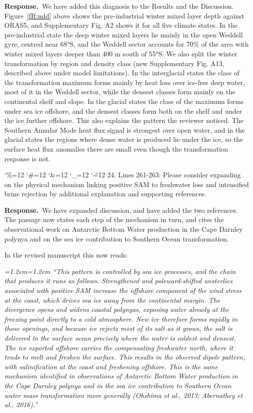 \documentclass[11pt,a4paper]{article}
\newcommand{\comment}[1]{\par\medskip\noindent\color{black}\begingroup\catcode`\%=12 \catcode`\#=12 \catcode`\&=12 \catcode`\_=12 \catcode`\~=12 \commentbody}
\newcommand{\commentbody}[1]{#1\endgroup\par\smallskip}
\newcommand{\response}{\par\noindent\color{chgcol}\textbf{Response.}\ }
\newenvironment{change}{\par\smallskip\color{chgcol}\small\itshape\leftskip=1.2em\rightskip=1.2em\noindent\ignorespaces}{\par\smallskip}
\begin{document}
\response We have added this diagnosis to the Results and the Discussion. Figure~\ref{fR:mld} above shows the pre-industrial winter mixed layer depth against ORAS5, and Supplementary Fig. A2 shows it for all five climate states. In the pre-industrial state the deep winter mixed layers lie mainly in the open Weddell gyre, centred near 68°S, and the Weddell sector accounts for 70\% of the area with winter mixed layers deeper than 400 m south of 55°S. We also split the winter transformation by region and density class (new Supplementary Fig. A13, described above under model limitations). In the interglacial states the class of the transformation maximum forms mainly by heat loss over ice-free deep water, most of it in the Weddell sector, while the densest classes form mainly on the continental shelf and slope. In the glacial states the class of the maximum forms under sea ice offshore, and the densest classes form both on the shelf and under the ice further offshore. This also explains the pattern the reviewer noticed. The Southern Annular Mode heat flux signal is strongest over open water, and in the glacial states the regions where dense water is produced lie under the ice, so the surface heat flux anomalies there are small even though the transformation response is not.

\comment{R1}{24. Lines 261-263: Please consider expanding on the physical mechanism linking positive SAM to freshwater loss and intensified brine rejection by additional explanation and supporting references.}

\response We have expanded discussion, and have added the two references. The passage now states each step of the mechanism in turn, and cites the observational work on Antarctic Bottom Water production in the Cape Darnley polynya and on the sea ice contribution to Southern Ocean transformation.

In the revised manuscript this now reads:

\begin{change}
``This pattern is controlled by sea ice processes, and the chain that produces it runs as follows. Strengthened and poleward-shifted westerlies associated with positive SAM increase the offshore component of the wind stress at the coast, which drives sea ice away from the continental margin. The divergence opens and widens coastal polynyas, exposing water already at the freezing point directly to a cold atmosphere. New ice therefore forms rapidly in those openings, and because ice rejects most of its salt as it grows, the salt is delivered to the surface ocean precisely where the water is coldest and densest. The ice exported offshore carries the compensating freshwater north, where it tends to melt and freshen the surface. This results in the observed dipole pattern, with salinification at the coast and freshening offshore. This is the same mechanism identified in observations of Antarctic Bottom Water production in the Cape Darnley polynya and in the sea ice contribution to Southern Ocean water mass transformation more generally (Ohshima et al., 2013; Abernathey et al., 2016).''
\end{change}
\end{document}
